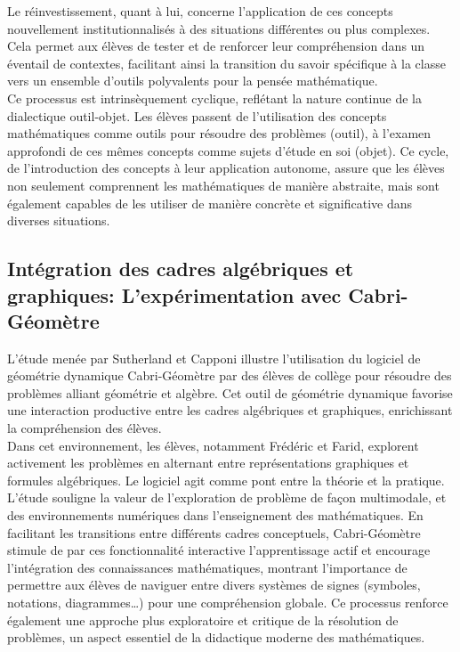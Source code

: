 Le réinvestissement,
quant à lui,
concerne l'application de ces concepts nouvellement institutionnalisés à des situations différentes ou plus complexes.
Cela permet aux élèves de tester et de renforcer leur compréhension dans un éventail de contextes,
facilitant ainsi la transition du savoir spécifique à la classe vers un ensemble d'outils polyvalents pour la pensée mathématique.\\

Ce processus est intrinsèquement cyclique,
reflétant la nature continue de la dialectique outil-objet.
Les élèves passent de l'utilisation des concepts mathématiques comme outils pour résoudre des problèmes (outil),
à l'examen approfondi de ces mêmes concepts comme sujets d'étude en soi (objet).
Ce cycle,
de l'introduction des concepts à leur application autonome,
assure que les élèves non seulement comprennent les mathématiques de manière abstraite,
mais sont également capables de les utiliser de manière concrète et significative dans diverses situations.

\subsection{Intégration des cadres algébriques et graphiques: L'expérimentation avec Cabri-Géomètre}

L'étude menée par Sutherland et Capponi illustre l'utilisation du logiciel de géométrie dynamique Cabri-Géomètre par des élèves de collège pour résoudre des problèmes alliant géométrie et algèbre.
Cet outil de géométrie dynamique favorise une interaction productive entre les cadres algébriques et graphiques,
enrichissant la compréhension des élèves.\\

Dans cet environnement,
les élèves,
notamment Frédéric et Farid,
explorent activement les problèmes en alternant entre représentations graphiques et formules algébriques.
Le logiciel agit comme pont entre la théorie et la pratique.\\

L'étude souligne la valeur de l'exploration de problème de façon multimodale,
et des environnements numériques dans l'enseignement des mathématiques.
En facilitant les transitions entre différents cadres conceptuels,
Cabri-Géomètre stimule de par ces fonctionnalité interactive l'apprentissage actif et encourage l'intégration des connaissances mathématiques,
montrant l'importance de permettre aux élèves de naviguer entre divers systèmes de signes (symboles, notations, diagrammes…) pour une compréhension globale.
Ce processus renforce également une approche plus exploratoire et critique de la résolution de problèmes,
un aspect essentiel de la didactique moderne des mathématiques.

